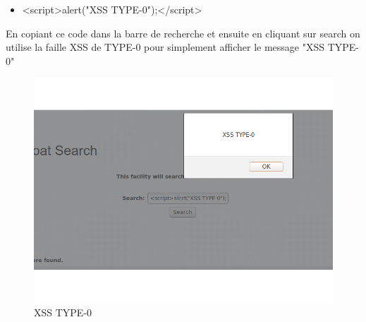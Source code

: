 \bigskip

\begin{itemize}
\item <script>alert("XSS TYPE-0");</script>
\end{itemize}

\bigskip

\begin{flushleft}
En copiant ce code dans la barre de recherche et ensuite en cliquant sur search on utilise la faille XSS de TYPE-0 pour simplement afficher le message "XSS TYPE-0"
\end{flushleft}

\begin{figure}[hbtp]
\caption{XSS TYPE-0}
\centering
\includegraphics[scale=0.3]{Web/assets/XSS0.png}
\end{figure}

